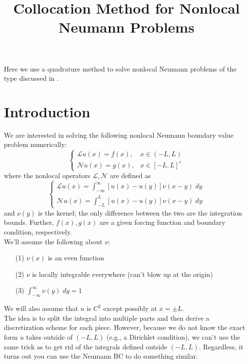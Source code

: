 \documentclass[pra,onecolumn,superscriptaddress,aps]{revtex4}
\begin{document}
\title{Collocation Method for Nonlocal Neumann Problems}


\maketitle
       
Here we use a quadrature method to solve nonlocal Neumann problems of the type discussed in \cite{Ros-Oton}. 

\section{Introduction}  
We are interested in solving the following nonlocal Neumann boundary value problem numerically:
\begin{equation}
\begin{cases}
\mathcal{L}u(x) = f(x), & x \in (-L, L) \\
\mathcal{N}u(x) = g(x), & x \in [-L,L]^c
\end{cases}
\end{equation}
where the nonlocal operators $\mathcal{L}, \mathcal{N}$ are defined as
\begin{equation} 
\begin{cases}
\mathcal{L}u(x) = \int^\infty_{-\infty} [u(x) - u(y)] \nu(x-y) \; dy\\[.2cm]
\mathcal{N}u(x) = \int^L_{-L} [u(x) - u(y)] \nu(x-y) \; dy 
\end{cases}
\label{eq2}
\end{equation}
and $\nu(y)$ is the kernel; the only difference between the two are the integration bounds. Further, $f(x), g(x)$ are a given forcing function and boundary condition, respectively. \\

We'll assume the following about $\nu$:
\begin{itemize}
\item[(1)] $\nu(x)$ is an even function
\item[(2)] $\nu$ is locally integrable everywhere (can't blow up at the origin)
\item[(3)] $\int^\infty_{-\infty} \nu(y) \; dy = 1$
\end{itemize}

We will also assume that $u$ is $C^2$ except possibly at $x = \pm L$.\\

The idea is to split the integral into multiple parts and then derive a discretization scheme for each piece. However, because we do not know the exact form $u$ takes outside of $(-L,L)$ (e.g., a Dirichlet condition), we can't use the same trick as \cite{Oberman} to get rid of the integrals defined outside $(-L,L)$. Regardless, it turns out you can use the Neumann BC to do something similar.\\
\end{document}
